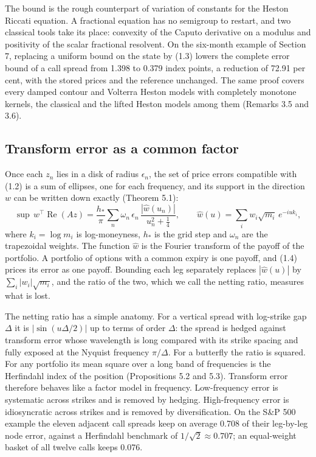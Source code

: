 \documentclass[11pt,a4paper]{article}
\begin{document}
The bound is the rough counterpart of variation of constants for the Heston Riccati equation. A fractional equation has no semigroup to restart, and two classical tools take its place: convexity of the Caputo derivative on a modulus and positivity of the scalar fractional resolvent. On the six-month example of Section 7, replacing a uniform bound on the state by (1.3) lowers the complete error bound of a call spread from 1.398 to 0.379 index points, a reduction of 72.91 per cent, with the stored prices and the reference unchanged. The same proof covers every damped contour and Volterra Heston models with completely monotone kernels, the classical and the lifted Heston models among them (Remarks 3.5 and 3.6).

\setcounter{subsection}{1}\subsection{Transform error as a common factor}

Once each \(z_n\) lies in a disk of radius \(\epsilon_n\), the set of price errors compatible with (1.2) is a sum of ellipses, one for each frequency, and its support in the direction \(w\) can be written down exactly (Theorem 5.1):
\begin{equation*}\tag{1.4}
\sup\,w^\top\operatorname{Re}(Az)=\frac{h_*}\pi\sum_n\omega_n\,\epsilon_n\,\frac{|\widehat w(u_n)|}{u_n^2+\frac14},
\qquad
\widehat w(u)=\sum_iw_i\sqrt{m_i}\,e^{-iuk_i},
\end{equation*}
where \(k_i=\log m_i\) is log-moneyness, \(h_*\) is the grid step and \(\omega_n\) are the trapezoidal weights. The function \(\widehat w\) is the Fourier transform of the payoff of the portfolio. A portfolio of options with a common expiry is one payoff, and (1.4) prices its error as one payoff. Bounding each leg separately replaces \(|\widehat w(u)|\) by \(\sum_i|w_i|\sqrt{m_i}\), and the ratio of the two, which we call the netting ratio, measures what is lost.

The netting ratio has a simple anatomy. For a vertical spread with log-strike gap \(\Delta\) it is \(|\sin(u\Delta/2)|\) up to terms of order \(\Delta\): the spread is hedged against transform error whose wavelength is long compared with its strike spacing and fully exposed at the Nyquist frequency \(\pi/\Delta\). For a butterfly the ratio is squared. For any portfolio its mean square over a long band of frequencies is the Herfindahl index of the position (Propositions 5.2 and 5.3). Transform error therefore behaves like a factor model in frequency. Low-frequency error is systematic across strikes and is removed by hedging. High-frequency error is idiosyncratic across strikes and is removed by diversification. On the S\&P 500 example the eleven adjacent call spreads keep on average 0.708 of their leg-by-leg node error, against a Herfindahl benchmark of \(1/\sqrt2\approx0.707\); an equal-weight basket of all twelve calls keeps 0.076.
\end{document}
